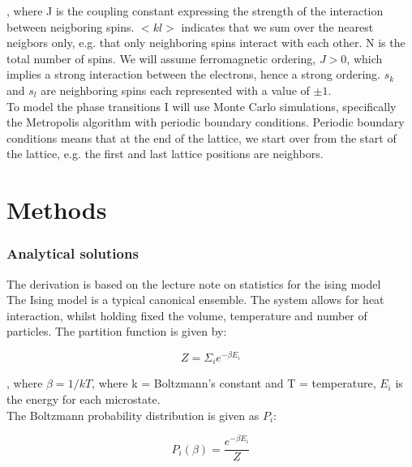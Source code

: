 , where J is the coupling constant expressing the strength of the interaction between neigboring spins. $<kl>$ indicates that we sum over the nearest neigbors only, e.g. that only neighboring spins interact with each other. N is the total number of spins. We will assume ferromagnetic ordering, 
$J > 0$, which implies a strong interaction between the electrons, hence a strong ordering. $s_k$ and $s_l$ are neighboring spins each represented with a value of $\pm 1$.\\




To model the phase transitions I will use Monte Carlo simulations, specifically the Metropolis algorithm with periodic boundary conditions. Periodic boundary conditions means that at the end of the lattice, we start over from the start of the lattice, e.g. the first and last lattice positions are neighbors.\\





\section{Methods}
\subsubsection{Analytical solutions}
The derivation is based on the lecture note on statistics for the ising model \cite{isingstat}\\



The Ising model is a typical canonical ensemble. The system allows for heat interaction, whilst holding fixed the volume, temperature and number of particles. The partition function is given by:

\begin{equation}
Z = \Sigma_ie^{-\beta E_i} 
\end{equation}

, where $\beta = 1/kT$, where k = Boltzmann's constant and T = temperature, $E_i$ is the energy for each microstate.\\


The Boltzmann probability distribution is given as $P_i$:

\begin{equation}
P_i(\beta) = \frac{e^{-\beta E_i}}{Z} 
\end{equation}\\



